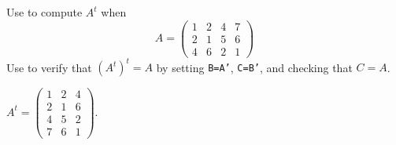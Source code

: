 \documentclass{ximera}
\begin{document}
\begin{exercise} \label{c1.3.5a}
Use \Matlab to compute $A^t$ when
\begin{equation} 
A = \left(\begin{array}{cccc} 
1 & 2 & 4 & 7 \\ 2 & 1 & 5 & 6 \\  4 & 6 & 2 & 1 
\end{array}\right)
\end{equation}
Use \Matlab to verify that $(A^t)^t=A$ by setting {\tt B=A'}, {\tt C=B'},
and checking that $C=A$.

\begin{solution}
\ans $A^t =
\left(\begin{array}{rrr}
1 & 2 & 4 \\
2 & 1 & 6 \\
4 & 5 & 2 \\
7 & 6 & 1
\end{array}\right).$

\end{solution}
\end{exercise}
\end{document}
